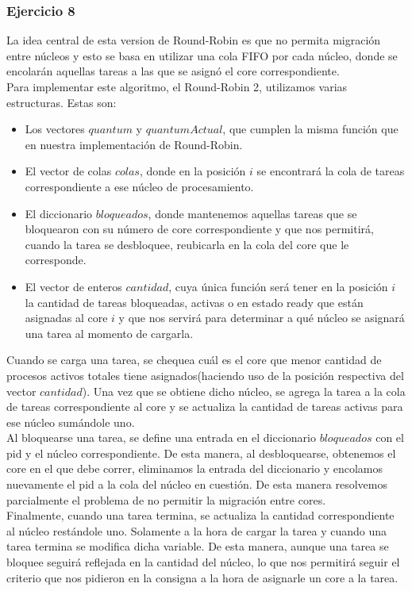  
 
\subsubsection[Resolución Ejercicio 8]{Ejercicio 8}
\indent \indent La idea central de esta version de Round-Robin es que no permita migración entre núcleos y esto se basa en utilizar una cola FIFO por cada núcleo, donde se encolarán aquellas tareas a las que se asignó el core correspondiente. \\ 
\indent Para implementar este algoritmo, el Round-Robin 2, utilizamos varias estructuras. Estas son:\\
\begin{itemize}
\item Los vectores $quantum$ y $quantumActual$, que cumplen la misma función que en nuestra implementación de Round-Robin.\\
\item El vector de colas $colas$, donde en la posición $i$ se encontrará la cola de tareas correspondiente a ese núcleo de procesamiento.\\
\item El diccionario $bloqueados$, donde mantenemos aquellas tareas que se bloquearon con su número de core correspondiente y que nos permitirá, cuando la tarea se desbloquee, reubicarla en la cola del core que le corresponde.\\ 
\item El vector de enteros $cantidad$, cuya única función será tener en la posición $i$ la cantidad de tareas bloqueadas, activas o en estado ready que están asignadas al core $i$ y que nos servirá para determinar a qué núcleo se asignará una tarea al momento de cargarla.\\
\end{itemize}

\indent \indent Cuando se carga una tarea, se chequea cuál es el core que menor cantidad de procesos activos totales tiene asignados(haciendo uso de la posición respectiva del vector $cantidad$). Una vez que se obtiene dicho núcleo, se agrega la tarea a la cola de tareas correspondiente al core y se actualiza la cantidad de tareas activas para ese núcleo sumándole uno.\\
\indent \indent Al bloquearse una tarea, se define una entrada en el diccionario $bloqueados$ con el pid y el núcleo correspondiente. De esta manera, al desbloquearse, obtenemos el core en el que debe correr, eliminamos la entrada del diccionario y encolamos nuevamente el pid a la cola del núcleo en cuestión. De esta manera resolvemos parcialmente el problema de no permitir la migración entre cores.\\
\indent \indent Finalmente, cuando una tarea termina, se actualiza la cantidad correspondiente al núcleo restándole uno. Solamente a la hora de cargar la tarea y cuando una tarea termina se modifica dicha variable. De esta manera, aunque una tarea se bloquee seguirá reflejada en la cantidad del núcleo, lo que nos permitirá seguir el criterio que nos pidieron en la consigna a la hora de asignarle un core a la tarea.\\

